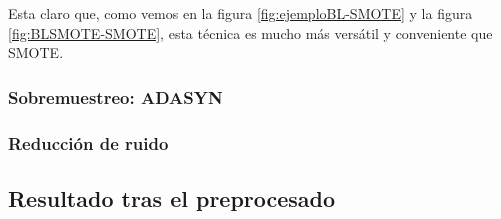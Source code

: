 Esta claro que, como vemos en la figura \ref{fig:ejemploBL-SMOTE} y la figura \ref{fig:BLSMOTE-SMOTE}, esta técnica es mucho más versátil y conveniente que SMOTE.


\subsubsection{Sobremuestreo: ADASYN}


\subsubsection{Reducción de ruido}



\newpage

\subsection{Resultado tras el preprocesado}



\newpage
